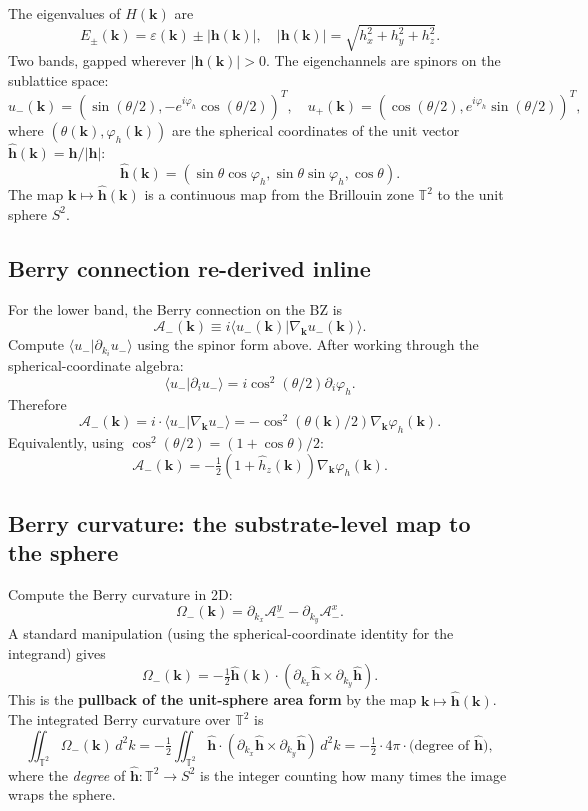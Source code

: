 \documentclass[11pt,a4paper]{article}
\begin{document}
The eigenvalues of $H(\mathbf{k})$ are
\[
E_\pm(\mathbf{k}) = \varepsilon(\mathbf{k}) \pm |\mathbf{h}(\mathbf{k})|, \quad |\mathbf{h}(\mathbf{k})| = \sqrt{h_x^2 + h_y^2 + h_z^2}.
\]
Two bands, gapped wherever $|\mathbf{h}(\mathbf{k})| > 0$. The eigenchannels are spinors on the sublattice space:
\[
u_-(\mathbf{k}) = (\sin(\theta/2), -e^{i\varphi_h}\cos(\theta/2))^T, \quad u_+(\mathbf{k}) = (\cos(\theta/2), e^{i\varphi_h}\sin(\theta/2))^T,
\]
where $(\theta(\mathbf{k}), \varphi_h(\mathbf{k}))$ are the spherical coordinates of the unit vector $\hat{\mathbf{h}}(\mathbf{k}) = \mathbf{h}/|\mathbf{h}|$:
\[
\hat{\mathbf{h}}(\mathbf{k}) = (\sin\theta\cos\varphi_h, \sin\theta\sin\varphi_h, \cos\theta).
\]
The map $\mathbf{k} \mapsto \hat{\mathbf{h}}(\mathbf{k})$ is a continuous map from the Brillouin zone $\mathbb{T}^2$ to the unit sphere $S^2$.

\subsection{Berry connection re-derived inline}

For the lower band, the Berry connection on the BZ is
\[
\mathcal{A}_-(\mathbf{k}) \equiv i\langle u_-(\mathbf{k})|\nabla_\mathbf{k} u_-(\mathbf{k})\rangle.
\]
Compute $\langle u_-|\partial_{k_i} u_-\rangle$ using the spinor form above. After working through the spherical-coordinate algebra:
\[
\langle u_-|\partial_i u_-\rangle = i\cos^2(\theta/2)\partial_i\varphi_h.
\]
Therefore
\[
\mathcal{A}_-(\mathbf{k}) = i\cdot\langle u_-|\nabla_\mathbf{k} u_-\rangle = -\cos^2(\theta(\mathbf{k})/2)\nabla_\mathbf{k}\varphi_h(\mathbf{k}).
\]
Equivalently, using $\cos^2(\theta/2) = (1 + \cos\theta)/2$:
\[
\mathcal{A}_-(\mathbf{k}) = -\tfrac{1}{2}(1 + \hat h_z(\mathbf{k}))\nabla_\mathbf{k}\varphi_h(\mathbf{k}).
\]

\subsection{Berry curvature: the substrate-level map to the sphere}

Compute the Berry curvature in 2D:
\[
\Omega_-(\mathbf{k}) = \partial_{k_x}\mathcal{A}_-^y - \partial_{k_y}\mathcal{A}_-^x.
\]
A standard manipulation (using the spherical-coordinate identity for the integrand) gives
\[
\Omega_-(\mathbf{k}) = -\tfrac{1}{2}\hat{\mathbf{h}}(\mathbf{k})\cdot(\partial_{k_x}\hat{\mathbf{h}}\times\partial_{k_y}\hat{\mathbf{h}}).
\]
This is the \textbf{pullback of the unit-sphere area form} by the map $\mathbf{k}\mapsto\hat{\mathbf{h}}(\mathbf{k})$. The integrated Berry curvature over $\mathbb{T}^2$ is
\[
\iint_{\mathbb{T}^2}\Omega_-(\mathbf{k})\, d^2k = -\tfrac{1}{2}\iint_{\mathbb{T}^2}\hat{\mathbf{h}}\cdot(\partial_{k_x}\hat{\mathbf{h}}\times\partial_{k_y}\hat{\mathbf{h}})\, d^2k = -\tfrac{1}{2}\cdot 4\pi\cdot\text{(degree of $\hat{\mathbf{h}}$)},
\]
where the \emph{degree} of $\hat{\mathbf{h}}: \mathbb{T}^2 \to S^2$ is the integer counting how many times the image wraps the sphere.
\end{document}
